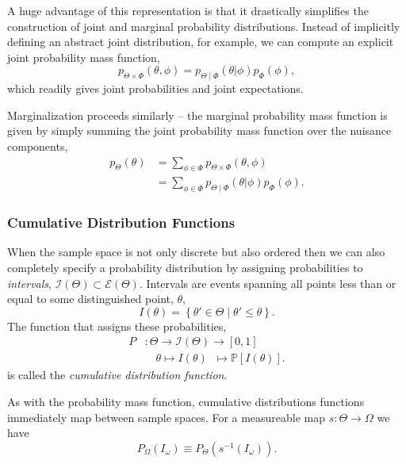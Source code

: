 \documentclass[11pt, oneside]{article}
\newcommand{\PP}{ \mathbb{P} }
\begin{document}
A huge advantage of this representation is that it drastically simplifies the
construction of joint and marginal probability distributions.  Instead of implicitly
defining an abstract joint distribution, for example, we can compute an 
explicit joint probability mass function,
%
\begin{equation*}
p_{\Theta \times \Phi} \! \left( \theta, \phi \right) = 
p_{\Theta \mid \Phi} \! \left( \theta | \phi \right) p_{\Phi} \! \left( \phi \right),
\end{equation*}
%
which readily gives joint probabilities and joint expectations.

Marginalization proceeds similarly -- the marginal probability mass function
is given by simply summing the joint probability mass function over the
nuisance components,
%
\begin{align*}
p_{\Theta} \! \left( \theta \right)
&= 
\sum_{\phi \in \Phi}  p_{\Theta \times \Phi} \! \left( \theta, \phi \right) \\
&=
\sum_{\phi \in \Phi}
p_{\Theta \mid \Phi} \! \left( \theta | \phi \right) p_{\Phi} \! \left( \phi \right).
\end{align*}

\subsubsection{Cumulative Distribution Functions}

When the sample space is not only discrete but also ordered then we
can also completely specify a probability distribution by assigning
probabilities to \emph{intervals}, 
$\mathcal{I} \! \left( \Theta \right) \subset \mathcal{E} \! \left( \Theta \right)$.
Intervals are events spanning all points less than or equal to some 
distinguished point, $\theta$,
%
\begin{equation*}
I \! \left( \theta \right) = \left\{ \theta' \in \Theta \mid \theta' \leq \theta \right\}.
\end{equation*}
%
The function that assigns these probabilities,
%
\begin{align*}
P 
&: \Theta \rightarrow \mathcal{I} \! 
\left( \Theta \right) \rightarrow \left[0, 1 \right]
\\
&\quad \theta \mapsto 
I \! \left( \theta \right) \;\; \mapsto 
\PP \! \left[ I \! \left( \theta \right) \right].
\end{align*}
%
is called the \emph{cumulative distribution function}.  

As with the probability mass function, cumulative distributions functions
immediately map between sample spaces.  For a measureable map
$s : \Theta \rightarrow \Omega$ we have
%
\begin{equation*}
P_{\Omega} \! \left( I_{\omega} \right) 
\equiv 
P_{\Theta} \! \left( s^{-1} \! \left( I_{\omega} \right) \right).
\end{equation*}
\end{document}
